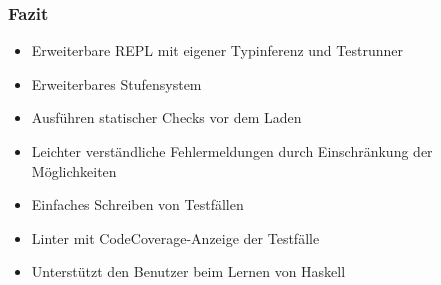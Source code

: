 \begin{frame}
	\frametitle{Fazit}
	\begin{itemize}
		\item{Erweiterbare REPL mit eigener Typinferenz und Testrunner}
		\item{Erweiterbares Stufensystem}
		\item{Ausführen statischer Checks vor dem Laden}
		\item{Leichter verständliche Fehlermeldungen durch Einschränkung der Möglichkeiten}
		\item{Einfaches Schreiben von Testfällen}
		\item{Linter mit CodeCoverage-Anzeige der Testfälle}
		\item{Unterstützt den Benutzer beim Lernen von Haskell}
	\end{itemize}
\end{frame}
